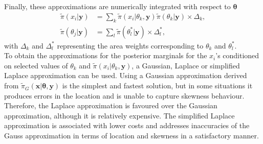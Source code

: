 Finally, these approximations are numerically integrated with respect to $\pmb{\theta}$
\begin{align}
    \widetilde{\pi}\left(x_i|\pmb{y}\right)&=\sum_k\widetilde{\pi}\left(x_i|\theta_k,\pmb{y}\right)\widetilde{\pi}\left(\theta_k|\pmb{y}\right)\times\Delta_k,\\
    \widetilde{\pi}\left(\theta_j|\pmb{y}\right)&=\sum_l\widetilde{\pi}\left(\theta_l^*|\pmb{y}\right)\times\Delta_l^*,
\end{align}
with $\Delta_k$ and $\Delta_l^*$ representing the area weights corresponding to $\theta_k$ and $\theta_l^*$. \\
To obtain the approximations for the posterior marginals for the $x_i$'s conditioned on selected values of $\theta_k$ and $\widetilde{\pi}\left(x_i|\theta_k,\pmb{y}\right)$, a Gaussian, Laplace or simplified Laplace approximation can be used. Using a Gaussian approximation derived from $\widetilde{\pi}_G\left(\pmb{x}|\pmb{\theta},\pmb{y}\right)$ is the simplest and fastest solution, but in some situations it produces errors in the location and is unable to capture skewness behaviour. Therefore, the Laplace approximation is favoured over the Gaussian approximation, although it is relatively expensive. The simplified Laplace approximation is associated with lower costs and addresses inaccuracies of the Gauss approximation in terms of location and skewness in a satisfactory manner\autocite[Cf.][]{moraga2019geospatial}.
